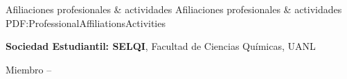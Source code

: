 \newpage
\Section
{Afiliaciones profesionales\newline
	\& actividades}
{Afiliaciones profesionales\newline
	\& actividades}
{PDF:ProfessionalAffiliationsActivities}

\Entry
{\textbf{Sociedad Estudiantil: SELQI}},
\newline
Facultad de Ciencias Químicas, UANL

\Gap
\BulletItem
Miembro
\hfill
{} -- 
